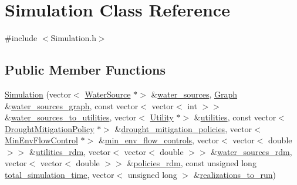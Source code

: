 \hypertarget{classSimulation}{}\section{Simulation Class Reference}
\label{classSimulation}


{\ttfamily \#include $<$Simulation.\+h$>$}

\subsection*{Public Member Functions}
\begin{DoxyCompactItemize}
\item 
\mbox{\hyperlink{classSimulation_ac9b9db9c3de5f9ff33f6ea89e2435c87_ac9b9db9c3de5f9ff33f6ea89e2435c87}{Simulation}} (vector$<$ \mbox{\hyperlink{classWaterSource}{Water\+Source}} $\ast$$>$ \&\mbox{\hyperlink{classSimulation_a7cf5edb885d26074e51e183408a3adab_a7cf5edb885d26074e51e183408a3adab}{water\+\_\+sources}}, \mbox{\hyperlink{classGraph}{Graph}} \&\mbox{\hyperlink{classSimulation_a04d4514b77ae98ec66cb8c2d633b2a52_a04d4514b77ae98ec66cb8c2d633b2a52}{water\+\_\+sources\+\_\+graph}}, const vector$<$ vector$<$ int $>$$>$ \&\mbox{\hyperlink{classSimulation_ab2825b5561679583c89a3936ce7dea39_ab2825b5561679583c89a3936ce7dea39}{water\+\_\+sources\+\_\+to\+\_\+utilities}}, vector$<$ \mbox{\hyperlink{classUtility}{Utility}} $\ast$$>$ \&\mbox{\hyperlink{classSimulation_a0de77bedebd4b324d334340b11f5afa6_a0de77bedebd4b324d334340b11f5afa6}{utilities}}, const vector$<$ \mbox{\hyperlink{classDroughtMitigationPolicy}{Drought\+Mitigation\+Policy}} $\ast$$>$ \&\mbox{\hyperlink{classSimulation_a23df9c17244a1cde0e32b42829623724_a23df9c17244a1cde0e32b42829623724}{drought\+\_\+mitigation\+\_\+policies}}, vector$<$ \mbox{\hyperlink{classMinEnvFlowControl}{Min\+Env\+Flow\+Control}} $\ast$$>$ \&\mbox{\hyperlink{classSimulation_a91d4cbb85145e9ebb5a9cb5d24dace15_a91d4cbb85145e9ebb5a9cb5d24dace15}{min\+\_\+env\+\_\+flow\+\_\+controls}}, vector$<$ vector$<$ double $>$$>$ \&\mbox{\hyperlink{classSimulation_a0e0766513f36e2e95e83b0611c3c078c_a0e0766513f36e2e95e83b0611c3c078c}{utilities\+\_\+rdm}}, vector$<$ vector$<$ double $>$$>$ \&\mbox{\hyperlink{classSimulation_afd35d5f1a11036d7c64668274ba0cc20_afd35d5f1a11036d7c64668274ba0cc20}{water\+\_\+sources\+\_\+rdm}}, vector$<$ vector$<$ double $>$$>$ \&\mbox{\hyperlink{classSimulation_a4fd8d11506b6427577c9d8aa43932b2c_a4fd8d11506b6427577c9d8aa43932b2c}{policies\+\_\+rdm}}, const unsigned long \mbox{\hyperlink{classSimulation_a6c7ad426929c59e061750b6d923aa859_a6c7ad426929c59e061750b6d923aa859}{total\+\_\+simulation\+\_\+time}}, vector$<$ unsigned long $>$ \&\mbox{\hyperlink{classSimulation_a6753fbf18cf9793b0ea3f4c070836af3_a6753fbf18cf9793b0ea3f4c070836af3}{realizations\+\_\+to\+\_\+run}})

\end{DoxyCompactItemize}
